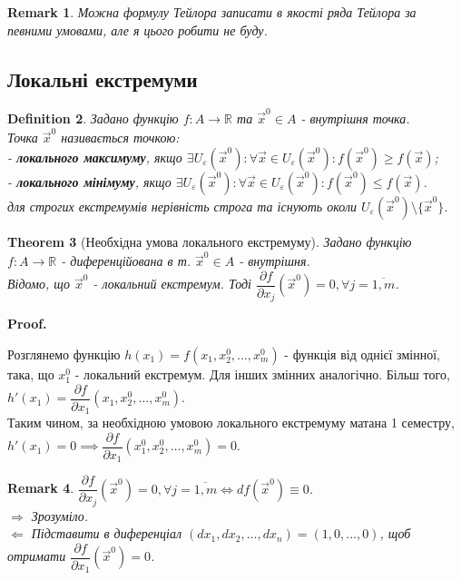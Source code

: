 \documentclass[a4paper, 10pt]{article}
\makeatletter
\def\departial#1#2{\dfrac{\partial {#1}}{\partial {#2}}}
\def\qed{$\blacksquare$}
\def\rightproof{$\boxed{\Rightarrow}$ }
\def\leftproof{$\boxed{\Leftarrow}$ }
\theoremstyle{theoremdd}
\newtheorem{theorem}{Theorem}[subsection]
\theoremstyle{theoremdd}
\theoremstyle{theoremdd}
\newtheorem{definition}[theorem]{Definition}
\theoremstyle{theoremdd}
\theoremstyle{theoremdd}
\theoremstyle{theoremdd}
\theoremstyle{theoremdd}
\newtheorem{remark}[theorem]{Remark}
\theoremstyle{theoremdd}
\theoremstyle{theoremdd}
\renewenvironment{proof}[1][Proof.\\]{\par
\pushQED{\hfill \qed}%
\normalfont \topsep6\p@\@plus6\p@\relax
\trivlist
\item\relax
{\bfseries
#1\@addpunct{.}}\hspace\labelsep\ignorespaces
}{%
\popQED\endtrivlist\@endpefalse
}
\makeatother
\begin{document}
\begin{remark}
Можна формулу Тейлора записати в якості ряда Тейлора за певними умовами, але я цього робити не буду.
\end{remark}

\subsection{Локальні екстремуми}
\begin{definition}
Задано функцію $f:A\to \mathbb{R}$ та $\vec{x}^0 \in A$ - внутрішня точка.\\
Точка $\vec{x}^0$ називається точкою:\\
- \textbf{локального максимуму}, якщо $\exists U_{\varepsilon}(\vec{x}^0): \forall \vec{x} \in U_{\varepsilon}(\vec{x}^0): f(\vec{x}^0) \geq f(\vec{x})$;\\
- \textbf{локального мінімуму}, якщо $\exists U_{\varepsilon}(\vec{x}^0): \forall \vec{x} \in U_{\varepsilon}(\vec{x}^0): f(\vec{x}^0) \leq f(\vec{x})$.\\
для строгих екстремумів нерівність строга та існують околи $U_\varepsilon(\vec{x}^0) \setminus \{\vec{x}^0\}$.
\end{definition}

\begin{theorem}[Необхідна умова локального екстремуму]
Задано функцію $f: A \to \mathbb{R}$  - диференційована в т. $\vec{x}^0 \in A$ - внутрішня.\\
Відомо, що $\vec{x}^0$ - локальний екстремум. Тоді $\departial{f}{x_j}(\vec{x}^0) = 0, \forall j=\overline{1,m}$.
\end{theorem}


\begin{proof}
Розглянемо функцію $h(x_1) = f(x_1,x_2^0,\dots,x_m^0)$ - функція від однієї змінної, така, що $x_1^0$ - локальний екстремум. Для інших змінних аналогічно. Більш того, $h'(x_1) = \departial{f}{x_1}(x_1,x_2^0,\dots,x_m^0)$.\\
Таким чином, за необхідною умовою локального екстремуму матана 1 семестру, \\ $h'(x_1) = 0 \implies \departial{f}{x_1}(x_1^0,x_2^0,\dots,x_m^0) = 0$.
\end{proof}

\begin{remark}
$\departial{f}{x_j}(\vec{x}^0) = 0, \forall j = \overline{1,m} \iff df(\vec{x}^0) \equiv 0$.\\
\rightproof Зрозуміло.\\
\leftproof Підставити в диференціал $(dx_1,dx_2,\dots,dx_n) = (1,0,\dots,0)$, щоб отримати $\departial{f}{x_1}(\vec{x}^0)=0$.
\end{remark}
\end{document}
